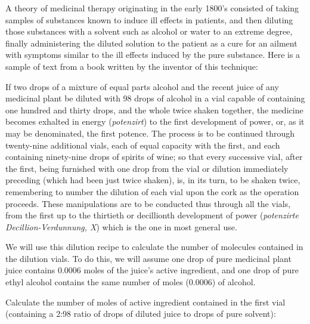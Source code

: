 

A theory of medicinal therapy originating in the early 1800's consisted of taking samples of substances known to induce ill effects in patients, and then diluting those substances with a solvent such as alcohol or water to an extreme degree, finally administering the diluted solution to the patient as a cure for an ailment with symptoms similar to the ill effects induced by the pure substance.  Here is a sample of text from a book written by the inventor of this technique:

\vskip 10pt {\narrower \noindent \baselineskip5pt

If two drops of a mixture of equal parts alcohol and the recent juice of any medicinal plant be diluted with 98 drops of alcohol in a vial capable of containing one hundred and thirty drops, and the whole twice shaken together, the medicine becomes exhalted in energy ({\it potenzirt}) to the first development of power, or, as it may be denominated, the first potence.  The process is to be continued through twenty-nine additional vials, each of equal capacity with the first, and each containing ninety-nine drops of spirits of wine; so that every successive vial, after the first, being furnished with one drop from the vial or dilution immediately preceding (which had been just twice shaken), is, in its turn, to be shaken twice, remembering to number the dilution of each vial upon the cork as the operation proceeds.  These manipulations are to be conducted thus through all the vials, from the first up to the thirtieth or decillionth development of power ({\it potenzirte Decillion-Verdunnung, X}) which is the one in most general use.

\par} \vskip 10pt

We will use this dilution recipe to calculate the number of molecules contained in the dilution vials.  To do this, we will assume one drop of pure medicinal plant juice contains 0.0006 moles of the juice's active ingredient, and one drop of pure ethyl alcohol contains the same number of moles (0.0006) of alcohol.  

\vskip 20pt

Calculate the number of moles of active ingredient contained in the first vial (containing a 2:98 ratio of drops of diluted juice to drops of pure solvent):

